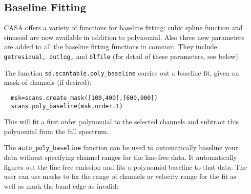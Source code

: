 \subsection{Baseline Fitting}
\label{subsection:sd.asap.BLfitting}

CASA offers a variety of functions for baseline fitting: cubic 
spline function and sinusoid are now available in addition to polynomial. 
Also three new parameters are added to all the baseline fitting 
functions in common. They include {\tt getresidual, outlog,} and 
{\tt blfile} (for detail of these parameters, see below). 

The function {\tt sd.scantable.poly\_baseline} carries out a
baseline fit, given an mask of channels (if desired):
\small
\begin{verbatim}
  msk=scans.create_mask([100,400],[600,900])
  scans.poly_baseline(msk,order=1)
\end{verbatim}
\normalsize
This will fit a first order polynomial to the selected channels and
subtract this polynomial from the full spectrum.

The {\tt auto\_poly\_baseline} function can be used to automatically
baseline your data without specifying channel ranges for the
line-free data. It automatically figures out the line-free emission
and fits a polynomial baseline to that data. The user can use masks to
fix the range of channels or velocity range for the fit as well as
mark the band edge as invalid:


